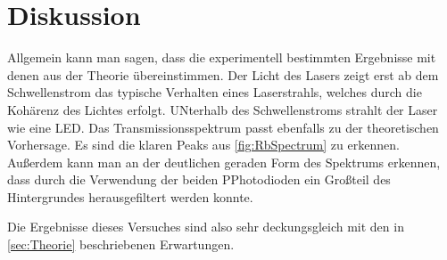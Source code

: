 \section{Diskussion}
\label{sec:Diskussion}

Allgemein kann man sagen, dass die experimentell bestimmten Ergebnisse mit denen aus der Theorie übereinstimmen.
Der Licht des Lasers zeigt erst ab dem Schwellenstrom das typische Verhalten eines Laserstrahls, welches durch die Kohärenz des Lichtes erfolgt. UNterhalb des Schwellenstroms strahlt der Laser wie eine LED.
Das Transmissionsspektrum passt ebenfalls zu der theoretischen Vorhersage. Es sind die klaren Peaks aus \autoref{fig:RbSpectrum} zu erkennen.
Außerdem kann man an der deutlichen geraden Form des Spektrums erkennen, dass durch die Verwendung der beiden PPhotodioden ein Großteil des Hintergrundes herausgefiltert werden konnte.

Die Ergebnisse dieses Versuches sind also sehr deckungsgleich mit den in \autoref{sec:Theorie} beschriebenen Erwartungen.